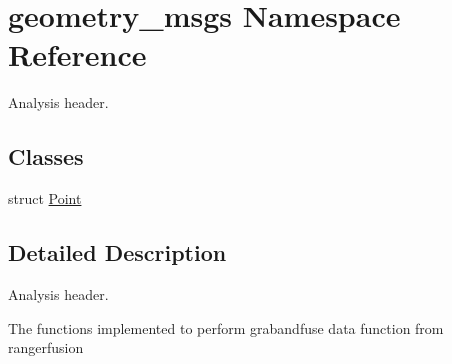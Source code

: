 \hypertarget{namespacegeometry__msgs}{}\section{geometry\+\_\+msgs Namespace Reference}
\label{namespacegeometry__msgs}


Analysis header.  


\subsection*{Classes}
\begin{DoxyCompactItemize}
\item 
struct \hyperlink{structgeometry__msgs_1_1Point}{Point}
\end{DoxyCompactItemize}


\subsection{Detailed Description}
Analysis header. 

The functions implemented to perform grabandfuse data function from rangerfusion 